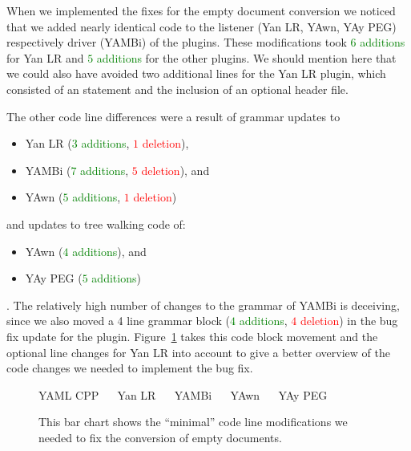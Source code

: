 When we implemented the fixes for the empty document conversion we noticed that we added nearly identical code to the listener (Yan LR, YAwn, YAy PEG) respectively driver (YAMBi) of the plugins. These modifications took \textcolor{Green}{$6$ additions} for Yan LR and \textcolor{Green}{$5$ additions} for the other plugins. We should mention here that we could also have avoided two additional lines for the Yan LR plugin, which consisted of an  statement and the inclusion of an optional header file.

The other code line differences were a result of grammar updates to

\begin{itemize}
  \item Yan LR (\textcolor{Green}{$3$ additions}, \textcolor{Red}{$1$ deletion}),
  \item YAMBi (\textcolor{Green}{$7$ additions}, \textcolor{Red}{$5$ deletion}), and
  \item YAwn (\textcolor{Green}{$5$ additions}, \textcolor{Red}{$1$ deletion})
\end{itemize}

and updates to tree walking code of:

\begin{itemize}
  \item YAwn (\textcolor{Green}{$4$ additions}), and
  \item YAy PEG (\textcolor{Green}{$5$ additions})
\end{itemize}

. The relatively high number of changes to the grammar of YAMBi is deceiving, since we also moved a 4 line grammar block (\textcolor{Green}{$4$ additions}, \textcolor{Red}{$4$ deletion}) in the bug fix update for the plugin. Figure~\ref{fig:empty_document_minimum_count} takes this code block movement and the optional line changes for Yan LR into account to give a better overview of the code changes we needed to implement the bug fix.

\begin{figure}[H]
  \begin{bchart}[max=20, width=0.8\textwidth, unit={~Lines of Code}]
  \end{bchart}
  \begin{center}
  \vspace{-0.5cm}
     YAML CPP ~~
     Yan LR ~~
     YAMBi ~~
     YAwn ~~
     YAy PEG
  \vspace{-0.5cm}
  \end{center}
  \caption{This bar chart shows the “minimal” code line modifications we needed to fix the conversion of empty documents.}
  \label{fig:empty_document_minimum_count}
\end{figure}

